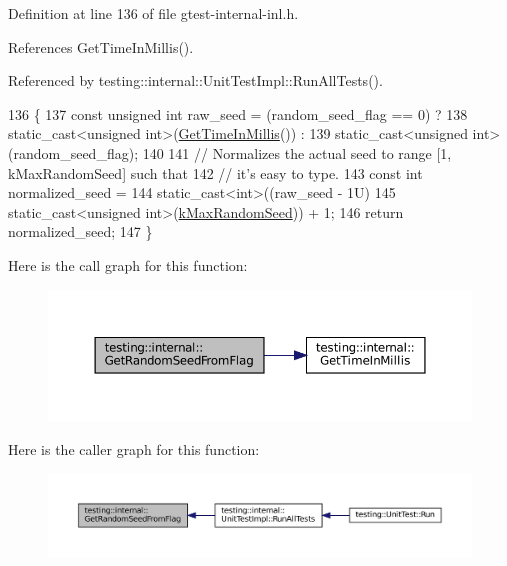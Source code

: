 Definition at line 136 of file gtest-\/internal-\/inl.\+h.



References Get\+Time\+In\+Millis().



Referenced by testing\+::internal\+::\+Unit\+Test\+Impl\+::\+Run\+All\+Tests().


\begin{DoxyCode}
136                                                          \{
137   \textcolor{keyword}{const} \textcolor{keywordtype}{unsigned} \textcolor{keywordtype}{int} raw\_seed = (random\_seed\_flag == 0) ?
138       static\_cast<unsigned int>(\hyperlink{namespacetesting_1_1internal_ae66b46943a429e6efb1db456d4cae90c}{GetTimeInMillis}()) :
139       static\_cast<unsigned int>(random\_seed\_flag);
140 
141   \textcolor{comment}{// Normalizes the actual seed to range [1, kMaxRandomSeed] such that}
142   \textcolor{comment}{// it's easy to type.}
143   \textcolor{keyword}{const} \textcolor{keywordtype}{int} normalized\_seed =
144       \textcolor{keyword}{static\_cast<}\textcolor{keywordtype}{int}\textcolor{keyword}{>}((raw\_seed - 1U) %
145                        static\_cast<unsigned int>(\hyperlink{namespacetesting_1_1internal_a41bd421ace53d23dbe85d9618c3afaee}{kMaxRandomSeed})) + 1;
146   \textcolor{keywordflow}{return} normalized\_seed;
147 \}
\end{DoxyCode}
Here is the call graph for this function\+:
\nopagebreak
\begin{figure}[H]
\begin{center}
\leavevmode
\includegraphics[width=350pt]{namespacetesting_1_1internal_ae74fedbdaebaac8d1202192266243b9e_cgraph}
\end{center}
\end{figure}
Here is the caller graph for this function\+:
\nopagebreak
\begin{figure}[H]
\begin{center}
\leavevmode
\includegraphics[width=350pt]{namespacetesting_1_1internal_ae74fedbdaebaac8d1202192266243b9e_icgraph}
\end{center}
\end{figure}
\mbox{\label{namespacetesting_1_1internal_ae88d1a6f95165c43c27a6c0e2d357e61}} 
